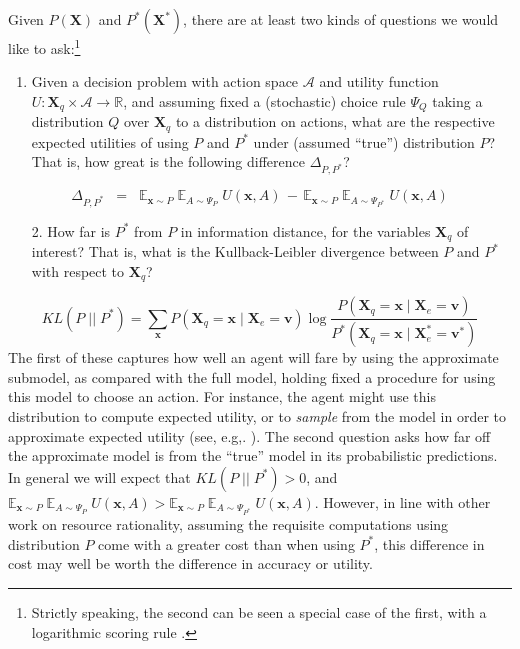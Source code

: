 \documentclass[10pt,letterpaper]{article}
\begin{document}
Given $P(\textbf{X})$ and $P^*(\textbf{X}^*)$, there are at least two kinds of questions we would like to ask:\footnote{Strictly speaking, the second can be seen a special case of the first, with a logarithmic scoring rule \citep{Bernardo}.} \begin{enumerate}
  \item Given a decision problem with action space $\mathcal{A}$ and utility function $U:\textbf{X}_q\times \mathcal{A} \rightarrow\mathbb{R}$, and assuming fixed a (stochastic) choice rule $\Psi_Q$ taking a distribution $Q$ over $\textbf{X}_q$ to a distribution on actions, what are the respective expected utilities of using $P$ and $P^*$ under (assumed ``true'') distribution $P$? That is, how great is the following difference $\Delta_{P,P^*}$? \end{enumerate}
  $$\Delta_{P,P^*} \;\; = \;\; \mathbb{E}_{\textbf{x}\sim P}\;\mathbb{E}_{A \sim \Psi_{P}}\;U(\textbf{x},A) \,-\, \mathbb{E}_{\textbf{x} \sim P}\;\mathbb{E}_{A \sim \Psi_{P^*}}\;U(\textbf{x},A)$$
  \begin{enumerate}
  \item[2.] How far is $P^*$ from $P$ in information distance, for the variables $\textbf{X}_q$ of interest? That is, what is the Kullback-Leibler divergence between $P$ and $P^*$ with respect to $\textbf{X}_q$?
\end{enumerate}$$KL(P \;||\; P^*)  =  \sum_{\textbf{x}} P(\textbf{X}_q = \textbf{x} \mid \textbf{X}_{e} = \textbf{v})\; \mbox{log} \; \frac{P(\textbf{X}_q = \textbf{x} \mid \textbf{X}_{e} = \textbf{v})}{P^*(\textbf{X}_q = \textbf{x} \mid \textbf{X}^*_{e} = \textbf{v}^*)}$$
The first of these captures how well an agent will fare by using the approximate submodel, as compared with the full model, holding fixed a procedure for using this model to choose an action. For instance, the agent might use this distribution to compute expected utility, or to \emph{sample} from the model in order to approximate expected utility (see, e.g,. \citealt{Vul2014}). The second question asks how far off the approximate model is from the ``true'' model in its probabilistic predictions. In general we will expect that $KL(P \;||\; P^*) > 0$, and $\mathbb{E}_{\textbf{x}\sim P}\;\mathbb{E}_{A \sim \Psi_{P}}\;U(\textbf{x},A) > \mathbb{E}_{\textbf{x} \sim P}\;\mathbb{E}_{A \sim \Psi_{P^*}}\;U(\textbf{x},A)$. However, in line with other work on resource rationality, assuming the requisite computations using distribution $P$ come with a greater cost than when using $P^*$, this difference in cost may well be worth the difference in accuracy or utility.
\end{document}
